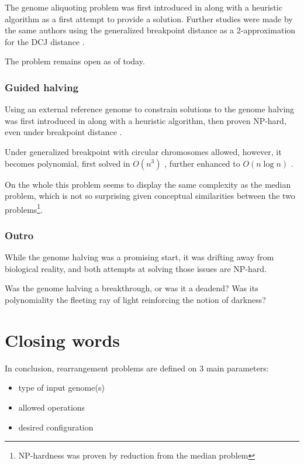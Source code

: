 \documentclass[11pt,final,twoside,nofrench]{thlifl}
\begin{document}
The genome aliquoting problem was first introduced in \cite{WS09} along with a heuristic algorithm as a first attempt to provide a solution. Further studies were made by the same authors using the generalized breakpoint distance as a 2-approximation for the DCJ distance \cite{WS11}.

The problem remains open as of today.

\subsubsection*{Guided halving}

Using an external reference genome to constrain solutions to the genome halving was first introduced in \cite{ZZS06} along with a heuristic algorithm, then proven NP-hard, even under breakpoint distance \cite{ZZS08}.

Under generalized breakpoint with circular chromosomes allowed, however, it becomes polynomial, first solved in $O(n^3)$ \cite{TZS09}, further enhanced to $O(n \log n)$ \cite{K11}.

On the whole this problem seems to display the same complexity as the median problem, which is not so surprising given conceptual similarities between the two problems\footnote{NP-hardness was proven by reduction from the median problem}.

\subsubsection*{Outro}

While the genome halving was a promising start, it was drifting away from biological reality, and both attempts at solving those issues are NP-hard.

Was the genome halving a breakthrough, or was it a deadend? Was its polynomiality the fleeting ray of light reinforcing the notion of darkness?

\section{Closing words}

In conclusion, rearrangement problems are defined on 3 main parameters:
\begin{itemize}
\item type of input genome(s)
\item allowed operations
\item desired configuration
\end{itemize}
\end{document}
